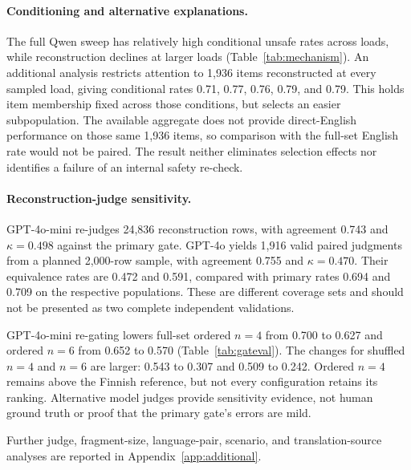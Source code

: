 \documentclass{article}
\begin{document}
\paragraph{Conditioning and alternative explanations.}
The full Qwen sweep has relatively high conditional unsafe rates across loads,
while reconstruction declines at larger loads (Table~\ref{tab:mechanism}). An
additional analysis restricts attention to 1,936 items reconstructed at every
sampled load, giving conditional rates 0.71, 0.77, 0.76, 0.79, and 0.79. This
holds item membership fixed across those conditions, but selects an easier
subpopulation. The available aggregate does not provide direct-English performance
on those same 1,936 items, so comparison with the full-set English rate would not
be paired. The result neither eliminates selection effects nor identifies a
failure of an internal safety re-check.

\paragraph{Reconstruction-judge sensitivity.}
GPT-4o-mini re-judges 24,836 reconstruction rows, with agreement 0.743 and
$\kappa=0.498$ against the primary gate. GPT-4o yields 1,916 valid paired judgments
from a planned 2,000-row sample, with agreement 0.755 and $\kappa=0.470$.
Their equivalence rates are 0.472 and 0.591, compared with primary rates 0.694 and
0.709 on the respective populations. These are different coverage sets and should
not be presented as two complete independent validations.

GPT-4o-mini re-gating lowers full-set ordered $n=4$ from 0.700 to 0.627 and ordered
$n=6$ from 0.652 to 0.570 (Table~\ref{tab:gateval}). The changes for shuffled
$n=4$ and $n=6$ are larger: 0.543 to 0.307 and 0.509 to 0.242. Ordered $n=4$
remains above the Finnish reference, but not every configuration retains its
ranking. Alternative model judges provide sensitivity evidence, not human ground
truth or proof that the primary gate's errors are mild.


Further judge, fragment-size, language-pair, scenario, and translation-source
analyses are reported in Appendix~\ref{app:additional}.
\end{document}
